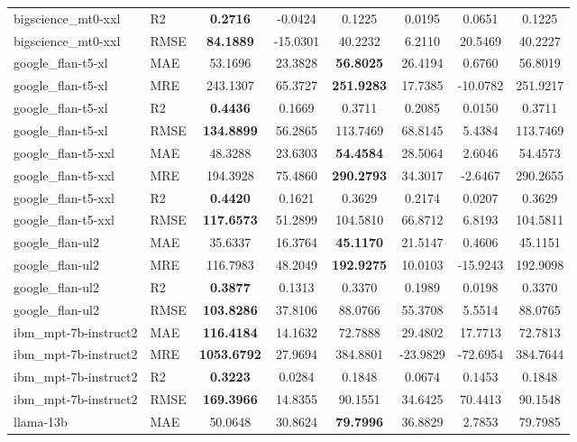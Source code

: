 \begin{table}[t]
\begin{tabular}{llcccccc}
bigscience\_mt0-xxl & R2 & \textbf{0.2716} & -0.0424 & 0.1225 & 0.0195 & 0.0651 & 0.1225 \\
bigscience\_mt0-xxl & RMSE & \textbf{84.1889} & -15.0301 & 40.2232 & 6.2110 & 20.5469 & 40.2227 \\
\addlinespace
google\_flan-t5-xl & MAE & 53.1696 & 23.3828 & \textbf{56.8025} & 26.4194 & 0.6760 & 56.8019 \\
google\_flan-t5-xl & MRE & 243.1307 & 65.3727 & \textbf{251.9283} & 17.7385 & -10.0782 & 251.9217 \\
google\_flan-t5-xl & R2 & \textbf{0.4436} & 0.1669 & 0.3711 & 0.2085 & 0.0150 & 0.3711 \\
google\_flan-t5-xl & RMSE & \textbf{134.8899} & 56.2865 & 113.7469 & 68.8145 & 5.4384 & 113.7469 \\
\addlinespace
google\_flan-t5-xxl & MAE & 48.3288 & 23.6303 & \textbf{54.4584} & 28.5064 & 2.6046 & 54.4573 \\
google\_flan-t5-xxl & MRE & 194.3928 & 75.4860 & \textbf{290.2793} & 34.3017 & -2.6467 & 290.2655 \\
google\_flan-t5-xxl & R2 & \textbf{0.4420} & 0.1621 & 0.3629 & 0.2174 & 0.0207 & 0.3629 \\
google\_flan-t5-xxl & RMSE & \textbf{117.6573} & 51.2899 & 104.5810 & 66.8712 & 6.8193 & 104.5811 \\
\addlinespace
google\_flan-ul2 & MAE & 35.6337 & 16.3764 & \textbf{45.1170} & 21.5147 & 0.4606 & 45.1151 \\
google\_flan-ul2 & MRE & 116.7983 & 48.2049 & \textbf{192.9275} & 10.0103 & -15.9243 & 192.9098 \\
google\_flan-ul2 & R2 & \textbf{0.3877} & 0.1313 & 0.3370 & 0.1989 & 0.0198 & 0.3370 \\
google\_flan-ul2 & RMSE & \textbf{103.8286} & 37.8106 & 88.0766 & 55.3708 & 5.5514 & 88.0765 \\
\addlinespace
ibm\_mpt-7b-instruct2 & MAE & \textbf{116.4184} & 14.1632 & 72.7888 & 29.4802 & 17.7713 & 72.7813 \\
ibm\_mpt-7b-instruct2 & MRE & \textbf{1053.6792} & 27.9694 & 384.8801 & -23.9829 & -72.6954 & 384.7644 \\
ibm\_mpt-7b-instruct2 & R2 & \textbf{0.3223} & 0.0284 & 0.1848 & 0.0674 & 0.1453 & 0.1848 \\
ibm\_mpt-7b-instruct2 & RMSE & \textbf{169.3966} & 14.8355 & 90.1551 & 34.6425 & 70.4413 & 90.1548 \\
\addlinespace
llama-13b & MAE & 50.0648 & 30.8624 & \textbf{79.7996} & 36.8829 & 2.7853 & 79.7985 \\

\end{tabular}
\end{table}
